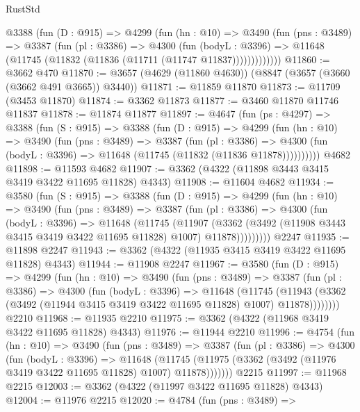 \begin{lexlean}{RustStd}
\begin{coremodule}
        @3388
          (fun (D : @915) =>
          @4299
            (fun (hn : @10) =>
            @3490
              (fun (pns : @3489) =>
              @3387
                (fun (pl : @3386) =>
                @4300
                  (fun (bodyL : @3396) =>
                  @11648 (@11745 (@11832 (@11836 (@11711 (@11747 @11837)))))))))))))
@11860 := @3662 @470
@11870 := @3657 (@4629 (@11860 @4630)) (@8847 (@3657 (@3660 (@3662 @491 @3665)) @3440))
@11871 := @11859 @11870
@11873 := @11709 (@3453 @11870)
@11874 := @3362 @11873
@11877 := @3460 @11870 @11746 @11837
@11878 := @11874 @11877
@11897 := @4647
    (fun (ps : @4297) =>
    @3388
      (fun (S : @915) =>
      @3388
        (fun (D : @915) =>
        @4299
          (fun (hn : @10) =>
          @3490
            (fun (pns : @3489) =>
            @3387
              (fun (pl : @3386) =>
              @4300 (fun (bodyL : @3396) => @11648 (@11745 (@11832 (@11836 @11878))))))))))
    @4682
@11898 := @11593 @4682
@11907 := @3362 (@4322 (@11898 @3443 @3415 @3419 @3422 @11695 @11828) @4343)
@11908 := @11604 @4682
@11934 := @3580
    (fun (S : @915) =>
    @3388
      (fun (D : @915) =>
      @4299
        (fun (hn : @10) =>
        @3490
          (fun (pns : @3489) =>
          @3387
            (fun (pl : @3386) =>
            @4300
              (fun (bodyL : @3396) =>
              @11648
                (@11745
                  (@11907
                    (@3362
                      (@3492 (@11908 @3443 @3415 @3419 @3422 @11695 @11828) @1007)
                      @11878)))))))))
    @2247
@11935 := @11898 @2247
@11943 := @3362 (@4322 (@11935 @3415 @3419 @3422 @11695 @11828) @4343)
@11944 := @11908 @2247
@11967 := @3580
    (fun (D : @915) =>
    @4299
      (fun (hn : @10) =>
      @3490
        (fun (pns : @3489) =>
        @3387
          (fun (pl : @3386) =>
          @4300
            (fun (bodyL : @3396) =>
            @11648
              (@11745
                (@11943 (@3362 (@3492 (@11944 @3415 @3419 @3422 @11695 @11828) @1007) @11878))))))))
    @2210
@11968 := @11935 @2210
@11975 := @3362 (@4322 (@11968 @3419 @3422 @11695 @11828) @4343)
@11976 := @11944 @2210
@11996 := @4754
    (fun (hn : @10) =>
    @3490
      (fun (pns : @3489) =>
      @3387
        (fun (pl : @3386) =>
        @4300
          (fun (bodyL : @3396) =>
          @11648
            (@11745 (@11975 (@3362 (@3492 (@11976 @3419 @3422 @11695 @11828) @1007) @11878)))))))
    @2215
@11997 := @11968 @2215
@12003 := @3362 (@4322 (@11997 @3422 @11695 @11828) @4343)
@12004 := @11976 @2215
@12020 := @4784
    (fun (pns : @3489) =>

\end{coremodule}
\end{lexlean}
